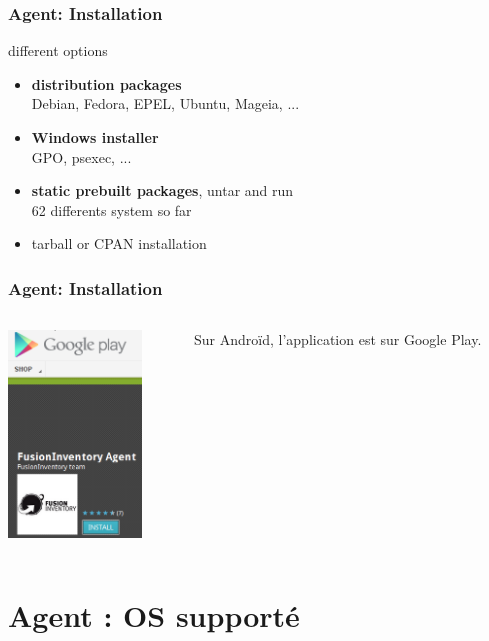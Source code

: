 \documentclass{beamer}
\begin{document}
\begin{frame}
    \frametitle{Agent: Installation}


    \begin{block}{different options}
        \begin{itemize}
            \item \textbf{distribution packages} \\
            \small{Debian, Fedora, EPEL, Ubuntu, Mageia, ...}
            \item \textbf{Windows installer} \\
            \small{GPO, psexec, ...}
            \item \textbf{static prebuilt packages}, untar and run \\
            \small{62 differents system so far}
            \item tarball or CPAN installation
        \end{itemize}
    \end{block}
\end{frame}

\begin{frame}
    \frametitle{Agent: Installation}

   \begin{columns}
   \begin{column}{0.35\textwidth}
\includegraphics[height=5.5cm]{pics/googleplay.png}
 \end{column}
 \begin{column}{0.65\textwidth}
Sur Androïd, l'application est sur Google Play.
 \end{column}
\end{columns}

\end{frame}


\section{Agent : OS supporté}
\end{document}

